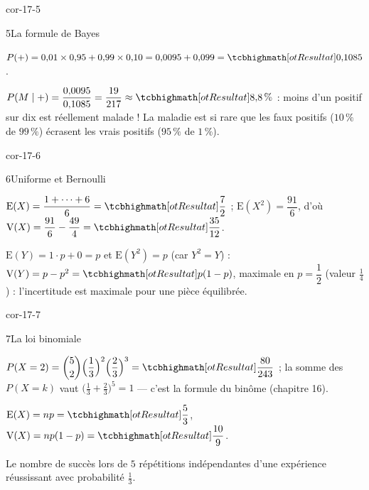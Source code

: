 \begin{blocLivre}{cor-17-5}
\begin{corrige}{5}{La formule de Bayes}
\begin{questions}
  \item $P(+)=0{,}01\times0{,}95+0{,}99\times0{,}10
    =0{,}0095+0{,}099=\res{0{,}1085}$.
  \item $P(M\mid+)=\dfrac{0{,}0095}{0{,}1085}=\dfrac{19}{217}
    \approx\res{8{,}8\,\%}$ : moins d'un positif sur dix est réellement
    malade ! La maladie est si rare que les faux positifs ($10\,\%$ de
    $99\,\%$) écrasent les vrais positifs ($95\,\%$ de $1\,\%$).
\end{questions}
\end{corrige}
\end{blocLivre}

\begin{blocLivre}{cor-17-6}
\begin{corrige}{6}{Uniforme et Bernoulli}
\begin{questions}
  \item $\mathrm{E}(X)=\dfrac{1+\dots+6}{6}=\res{\dfrac72}$ ;
    $\mathrm{E}(X^{2})=\dfrac{91}{6}$, d'où
    $\mathrm{V}(X)=\dfrac{91}{6}-\dfrac{49}{4}=\res{\dfrac{35}{12}}$.
  \item $\mathrm{E}(Y)=1\cdot p+0=p$ et
    $\mathrm{E}(Y^{2})=p$ (car $Y^{2}=Y$) :
    $\mathrm{V}(Y)=p-p^{2}=\res{p(1-p)}$, maximale en
    $p=\dfrac12$ (valeur $\frac14$) : l'incertitude est maximale pour une
    pièce équilibrée.
\end{questions}
\end{corrige}
\end{blocLivre}

\begin{blocLivre}{cor-17-7}
\begin{corrige}{7}{La loi binomiale}
\begin{questions}
  \item $P(X=2)=\dbinom52\Bigl(\dfrac13\Bigr)^{2}\Bigl(\dfrac23\Bigr)^{3}
    =\res{\dfrac{80}{243}}$ ; la somme des $P(X=k)$ vaut
    $\bigl(\frac13+\frac23\bigr)^{5}=1$ — c'est la formule du binôme
    (chapitre 16).
  \item $\mathrm{E}(X)=np=\res{\dfrac53}$,
    $\mathrm{V}(X)=np(1-p)=\res{\dfrac{10}{9}}$.
  \item Le nombre de succès lors de $5$ répétitions indépendantes d'une
    expérience réussissant avec probabilité $\frac13$.
\end{questions}
\end{corrige}
\end{blocLivre}

